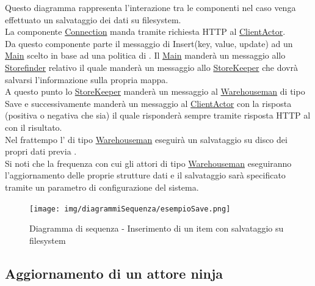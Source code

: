 \documentclass{scalatekids-article}
\begin{document}
Questo diagramma rappresenta l'interazione tra le componenti nel caso venga
effettuato un salvataggio dei dati su filesystem.\\
La componente \hyperref[sec:actorbase::driver::client::Connection]{Connection}
manda tramite richiesta HTTP al \hyperref[sec:actorbase::actorsystem::actors::clientactor::ClientActor]{ClientActor}.\\
Da questo componente parte il messaggio di Insert(key, value, update) ad un \hyperref[sec:actorbase::actorsystem::actors::main::Main]{Main} scelto in base ad una
politica di . Il \hyperref[sec:actorbase::actorsystem::actors::main::Main]{Main} manderà un messaggio allo
\hyperref[sec:actorbase::actorsystem::actors::storefinder::Storefinder]{Storefinder} relativo il quale manderà un messaggio
allo \hyperref[sec:actorbase::actorsystem::actors::storekeeper::StoreKeeper]{StoreKeeper} che dovrà salvarsi l'informazione sulla propria mappa.\\
A questo punto lo \hyperref[sec:actorbase::actorsystem::actors::storekeeper::StoreKeeper]{StoreKeeper} manderà un messaggio al
\hyperref[sec:actorbase::actorsystem::actors::warehouseman::Warehouseman]{Warehouseman} di tipo Save e
successivamente manderà un messaggio al \hyperref[sec:actorbase::actorsystem::actors::clientactor::ClientActor]{ClientActor} con la risposta
(positiva o negativa che sia) il quale risponderà sempre tramite risposta HTTP al  con il risultato.\\
Nel frattempo l' di tipo \hyperref[sec:actorbase::actorsystem::actors::warehouseman::Warehouseman]{Warehouseman} eseguirà un salvataggio
su disco dei propri dati previa .\\
Si noti che la frequenza con cui gli attori di tipo \hyperref[sec:actorbase::actorsystem::actors::warehouseman::Warehouseman]{Warehouseman} eseguiranno
l'aggiornamento delle proprie strutture dati e il salvataggio sarà specificato
tramite un parametro di configurazione del sistema.\\
\begin{figure}[H]
  \begin{center}
    \texttt{[image: img/diagrammiSequenza/esempioSave.png]}
    \caption{Diagramma di sequenza - Inserimento di un item con salvataggio su filesystem}
  \end{center}
\end{figure}

\subsection{Aggiornamento di un attore ninja}
\end{document}
